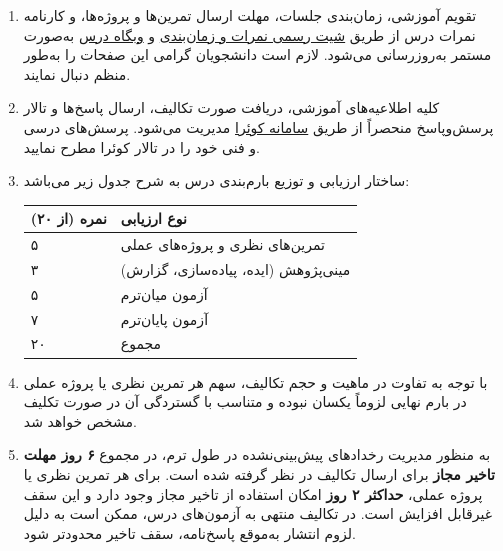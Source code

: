 \documentclass[a4paper,11pt]{article}
\begin{document}
\begin{enumerate}[label=\textbf{\arabic*.}]
    \item تقویم آموزشی، زمان‌بندی جلسات، مهلت ارسال تمرین‌ها و پروژه‌ها، و کارنامه نمرات درس از طریق \href{https://docs.google.com/spreadsheets/d/1Uwf9ALhFvDw-EpCf7Jm9pl4OP4Iqzum-A597koQE-sA/edit?usp=sharing}{شیت رسمی نمرات و زمان‌بندی} و \href{https://sut-ce-courses.github.io/mlse/}{وبگاه درس} به‌صورت مستمر به‌روزرسانی می‌شود. لازم است دانشجویان گرامی این صفحات را به‌طور منظم دنبال نمایند.

    \item کلیه اطلاعیه‌های آموزشی، دریافت صورت تکالیف، ارسال پاسخ‌ها و تالار پرسش‌وپاسخ منحصراً از طریق \href{https://quera.org/course/add_to_course/course/29353/}{سامانه کوئرا} مدیریت می‌شود. پرسش‌های درسی و فنی خود را در تالار کوئرا مطرح نمایید.

    \item ساختار ارزیابی و توزیع بارم‌بندی درس به شرح جدول زیر می‌باشد:
    \begin{center}
        \renewcommand{\arraystretch}{1.15}
        \begin{tabular}{|p{3cm}|p{6.5cm}|}
            \hline
            \centering \textbf{نمره (از ۲۰)} & \centering \textbf{نوع ارزیابی} \tabularnewline
            \hline
            \centering ۵ & \centering تمرین‌های نظری و پروژه‌های عملی \tabularnewline
            \hline
            \centering ۳ & \centering مینی‌پژوهش (ایده، پیاده‌سازی، گزارش) \tabularnewline
            \hline
            \centering ۵ & \centering آزمون میان‌ترم \tabularnewline
            \hline
            \centering ۷ & \centering آزمون پایان‌ترم \tabularnewline
            \hline
            \hline
            \centering ۲۰ & \centering مجموع \tabularnewline
            \hline
        \end{tabular}
    \end{center}

    \item با توجه به تفاوت در ماهیت و حجم تکالیف، سهم هر تمرین نظری یا پروژه عملی در بارم نهایی لزوماً یکسان نبوده و متناسب با گستردگی آن در صورت تکلیف مشخص خواهد شد.

    \item به منظور مدیریت رخدادهای پیش‌بینی‌نشده در طول ترم، در مجموع \textbf{۶ روز مهلت تاخیر مجاز} برای ارسال تکالیف در نظر گرفته شده است. برای هر تمرین نظری یا پروژه عملی، \textbf{حداکثر ۲ روز} امکان استفاده از تاخیر مجاز وجود دارد و این سقف غیرقابل افزایش است. در تکالیف منتهی به آزمون‌های درس، ممکن است به دلیل لزوم انتشار به‌موقع پاسخ‌نامه، سقف تاخیر محدودتر شود.


\end{enumerate}
\end{document}
